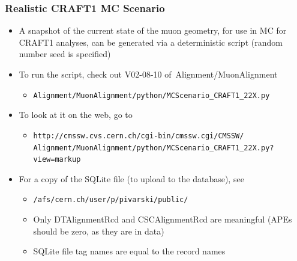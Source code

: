 \documentclass[compress]{beamer}
\begin{document}
\begin{frame}
\frametitle{Realistic CRAFT1 MC Scenario}
\begin{itemize}\setlength{\itemsep}{0.2 cm}
\item A snapshot of the current state of the muon geometry, for use in
  MC for CRAFT1 analyses, can be generated via a deterministic script
  (random number seed is specified)

\item To run the script, check out V02-08-10 \mbox{of Alignment/MuonAlignment\hspace{-1 cm}}
\begin{itemize}
\item {\tt \scriptsize Alignment/MuonAlignment/python/MCScenario\_CRAFT1\_22X.py}
\end{itemize}

\item To look at it on the web, go to
\begin{itemize}
\item {\tt \scriptsize http://cmssw.cvs.cern.ch/cgi-bin/cmssw.cgi/CMSSW/} {\tt \scriptsize Alignment/MuonAlignment/python/MCScenario\_CRAFT1\_22X.py?view=markup}
\end{itemize}

\item For a copy of the SQLite file (to upload to the database), see
\begin{itemize}
\item {\tt \scriptsize /afs/cern.ch/user/p/pivarski/public/} \\ \hspace{1 cm}{\tt \scriptsize MCScenario\_CRAFT1\_22X\_V02-08-10.db}
\item Only DTAlignmentRcd and CSCAlignmentRcd are meaningful (APEs should be zero, as they are in data)
\item SQLite file tag names are equal to the record names
\end{itemize}

\end{itemize}
\end{frame}
\end{document}
